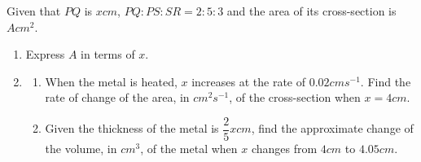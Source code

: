 \documentclass{report}
\begin{document}
\begin{multicols}{2}
\begin{enumerate}
\begin{center}
                  \end{center}
                  Given that $PQ$ is $x\textit{cm}$, $PQ:PS:SR = 2:5:3$ and the area of its
                  cross-section is $A\textit{cm}^2$.
                  \begin{enumerate}
                        \item Express $A$ in terms of $x$.
                        \item \begin{enumerate}
                                    \item When the metal is heated, $x$ increases at the rate of
                                          $0.02\textit{cm}\textit{s}^{-1}$. Find the rate of change of the area, in
                                          $\textit{cm}^2\textit{s}^{-1}$, of the cross-section when $x = 4\textit{cm}$.
                                    \item Given the thickness of the metal is $\dfrac{2}{5}x\textit{cm}$, find the
                                          approximate change of the volume, in $\textit{cm}^3$, of the metal when $x$
                                          changes from $4\textit{cm}$ to $4.05\textit{cm}$.
                              \end{enumerate}
                  \end{enumerate}
      \end{enumerate}
\end{multicols}
\end{document}
